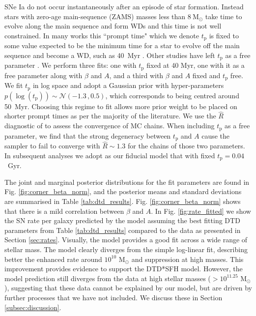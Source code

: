 \documentclass[fleqn,usenatbib]{mnras}
\begin{document}
SNe Ia do not occur instantaneously after an episode of star formation. Instead stars with zero-age main-sequence (ZAMS) masses less than $8~\mathrm{M}_{\odot}$ take time to evolve along the main sequence and form WDs and this time is not well constrained. In many works this ``prompt time" which we denote $t_{\mathrm{p}}$ is fixed to some value expected to be the minimum time for a star to evolve off the main sequence and become a WD, such as 40~Myr \citep{Maoz2012,Graur2013,Graur2014}. Other studies have left $t_{\mathrm{p}}$ as a free parameter \citep{Heringer2019,Castrillo2020}. We perform three fits: one with $t_{\mathrm{p}}$ fixed at 40 Myr, one with it as a free parameter along with $\beta$ and $A$, and a third with $\beta$ and $A$ fixed and  $t_{\mathrm{p}}$ free. We fit $t_{\mathrm{p}}$ in log space and adopt a Gaussian prior with hyper-parameters $p(\log(t_{\mathrm{p}})) \sim \mathcal{N}(-1.3\,,0.5)$, which corresponds to being centred around 50~Myr. Choosing this regime to fit allows more prior weight to be placed on shorter prompt times as per the majority of the literature. We use the $\hat{R}$ diagnostic of \citet{Vehtari2019} to assess the convergence of MC chains. When including $t_{\mathrm{p}}$ as a free parameter, we find that the strong degeneracy between $t_{\mathrm{p}}$ and $A$ cause the sampler to fail to converge with $\hat{R} \sim 1.3$ for the chains of those two parameters. In subsequent analyses we adopt as our fiducial model that with fixed $t_{\mathrm{p}} =0.04$~Gyr.

The joint and marginal posterior distributions for the fit parameters are found in Fig. \ref{fig:corner_beta_norm}, and the posterior means and standard deviations are summarised in Table \ref{tab:dtd_results}.  Fig. \ref{fig:corner_beta_norm} shows that there is a mild correlation between $\beta$ and $A$. In Fig. \ref{fig:rate_fitted} we show the SN rate per galaxy predicted by the model assuming the best fitting DTD parameters from Table \ref{tab:dtd_results} compared to the data as presented in Section \ref{sec:rates}. Visually, the model provides a good fit across a wide range of stellar mass. The model clearly diverges from the simple log-linear fit, describing better the enhanced rate around $10^{10}$ M$_{\odot}$ and suppression at high masses. This improvement provides evidence to support the DTD*SFH model. However, the model prediction still diverges from the data at high stellar masses ($>10^{11.25}$ M$_{\odot}$), suggesting that these data cannot be explained by our model, but are driven by further processes that we have not included. We discuss these in Section \ref{subsec:discussion}. 
\end{document}
